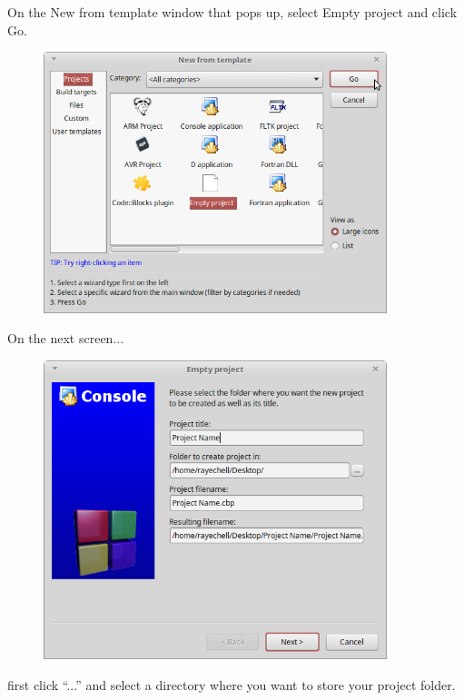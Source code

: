                 On the New from template window that pops up, select Empty project and click Go.
            
                \begin{figure}[h]
                    \centering
                    \includegraphics[width=10cm]{images-2018-01/codeblocks_emptyproject.png}
                \end{figure}

                \newpage

                On the next screen...
            
                \begin{figure}[h]
                    \centering
                    \includegraphics[width=10cm]{images-2018-01/codeblocks_newproject_dialog.png}
                \end{figure}

                first click ``...'' and select a directory where you want to store your project folder.

